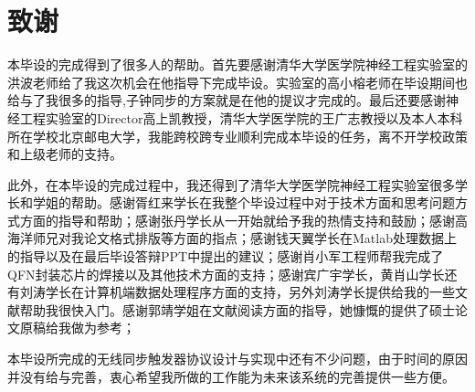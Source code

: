 \chapter*{致\qquad 谢}
\songti{} 

	本毕设的完成得到了很多人的帮助。首先要感谢清华大学医学院神经工程实验室的洪波老师给了我这次机会在他指导下完成毕设。实验室的高小榕老师在毕设期间也给与了我很多的指导,子钟同步的方案就是在他的提议才完成的。最后还要感谢神经工程实验室的Director高上凯教授，清华大学医学院的王广志教授以及本人本科所在学校北京邮电大学，我能跨校跨专业顺利完成本毕设的任务，离不开学校政策和上级老师的支持。

	此外，在本毕设的完成过程中，我还得到了清华大学医学院神经工程实验室很多学长和学姐的帮助。感谢胥红来学长在我整个毕设过程中对于技术方面和思考问题方式方面的指导和帮助；感谢张丹学长从一开始就给予我的热情支持和鼓励；感谢高海洋师兄对我论文格式排版等方面的指点；感谢钱天翼学长在Matlab处理数据上的指导以及在最后毕设答辩PPT中提出的建议；感谢肖小军工程师帮我完成了QFN封装芯片的焊接以及其他技术方面的支持；感谢宾广宇学长，黄肖山学长还有刘涛学长在计算机端数据处理程序方面的支持，另外刘涛学长提供给我的一些文献帮助我很快入门。感谢郭靖学姐在文献阅读方面的指导，她慷慨的提供了硕士论文原稿给我做为参考；

	本毕设所完成的无线同步触发器协议设计与实现中还有不少问题，由于时间的原因并没有给与完善，衷心希望我所做的工作能为未来该系统的完善提供一些方便。


